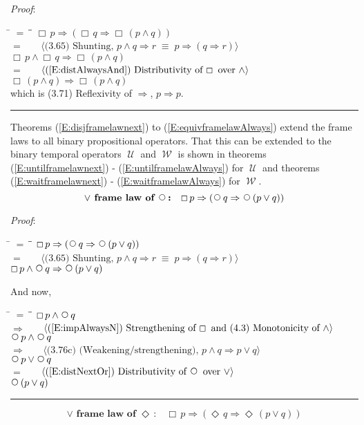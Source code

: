 \documentclass[12pt, fleqn, leqno]{article}
\newcommand{\lgap}{2pt}                             %
\newcommand{\mymathindent}{24pt}                    %
\newcommand{\equivs}{\ensuremath{\;\equiv\;}}       %
\newcommand{\impl}{\ensuremath{\Rightarrow}}        %
\newcommand{\Until}{\;\mathcal{U}\;}
\newcommand{\Wait}{\;\mathcal{W}\;}
\newcommand{\Next}{\;\,\text{\raisebox{3.5pt}{\circle{6}}}}
\newcommand{\Event}{\Diamond\,}
\newcommand{\Always}{\Box\,}
\newcommand{\myqed}{\rule[-.23ex]{1.2ex}{2.0ex}}
\newcommand{\myqedtab}{\hspace{384pt}}              %
\newcommand{\Gll} {\langle}                         %
\newcommand{\Ggg} {\rangle}                         %
\newcommand{\Hint}[1]     {\ \ \ $\Gll              \mbox{#1} \Ggg$ }   %
\begin{document}
\emph{Proof}: 
\begin{tabbing}
\hspace{\mymathindent} \= $= \;$ \= \myqedtab \= \kill
  \> \>   $\Always p \impl (\Always q \impl \Always (p \land q))$\\[\lgap]
  \> $=$  \>  \Hint{(3.65) Shunting, $p\land q\impl r\equivs p\impl (q\impl r)$}\\[\lgap]
  \> \>   $\Always p \land \Always q \impl \Always (p \land q)$\\[\lgap]
  \> $=$  \>  \Hint{(\ref{E:distAlwaysAnd}) Distributivity of $\Always$ over $\land$}\\[\lgap]
  \> \>   $\Always (p \land q) \impl \Always (p \land q)$\\[\lgap]
   \> which is (3.71) Reflexivity of $\impl$, $p\impl p$. \quad \myqed
\end{tabbing}
Theorems (\ref{E:disjframelawnext}) to (\ref{E:equivframelawAlways}) extend the frame laws
to all binary propositional operators. That this can be extended to the binary temporal operators
$\Until$ and $\Wait$ is shown in theorems (\ref{E:untilframelawnext}) - (\ref{E:untilframelawAlways})
for $\Until$ and theorems (\ref{E:waitframelawnext}) - (\ref{E:waitframelawAlways}) for $\Wait$.
\begin{equation}\label{E:disjframelawnext}
\textbf{$\lor$ frame law of $\Next$:}\quad \Always p \impl (\Next q \impl \Next (p \lor q))
\end{equation}

\emph{Proof}:
\begin{tabbing}
\hspace{\mymathindent} \= $= \;$ \= \myqedtab \= \kill
  \> \>   $\Always p \impl (\Next q \impl \Next (p \lor q))$\\[\lgap]
  \> $=$  \>  \Hint{(3.65) Shunting, $p\land q\impl r\equivs p\impl (q\impl r)$}\\[\lgap]
  \> \>   $\Always p \land \Next q \impl \Next (p \lor q)$
\end{tabbing}
And now,
\begin{tabbing}
\hspace{\mymathindent} \= $= \;$ \= \myqedtab \= \kill
  \> \>   $\Always p \land \Next q $\\[\lgap]
  \> $\impl$  \>  \Hint{(\ref{E:impAlwaysN}) Strengthening of $\Always$ and (4.3) Monotonicity of $\land$}\\[\lgap]
  \> \>   $\Next p \land \Next q $\\[\lgap]
   \> $\impl$ \> \Hint{(3.76c) (Weakening/strengthening), $p\land q \impl p \lor q$} \\[\lgap]
   \> \>   $\Next p \lor \Next q $\\[\lgap]
  \> $=$  \>  \Hint{(\ref{E:distNextOr}) Distributivity of $\Next$ over $\lor$}\\[\lgap]
  \> \>   $\Next (p \lor q)$\quad \myqed
\end{tabbing}
\begin{equation}\label{E:disjframelawEvent}
\textbf{$\lor$ frame law of $\Event$:}\quad \Always p \impl (\Event q \impl \Event (p \lor q))
\end{equation}
\end{document}
